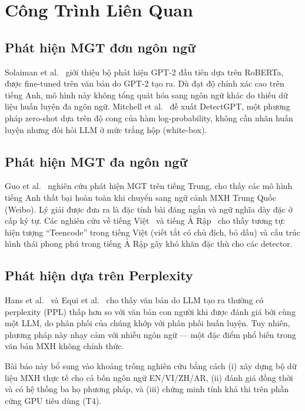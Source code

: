 
\section{Công Trình Liên Quan}
\label{sec:related}

\subsection*{Phát hiện MGT đơn ngôn ngữ}

Solaiman et al.~\cite{solaiman2019gpt2detector} giới thiệu bộ phát hiện
GPT-2 đầu tiên dựa trên RoBERTa, được fine-tuned trên văn bản do GPT-2
tạo ra. Dù đạt độ chính xác cao trên tiếng Anh, mô hình này không tổng
quát hóa sang ngôn ngữ khác do thiếu dữ liệu huấn luyện đa ngôn ngữ.
Mitchell et al.~\cite{mitchell2023detectgpt} đề xuất DetectGPT, một
phương pháp zero-shot dựa trên độ cong của hàm log-probability,
không cần nhãn huấn luyện nhưng đòi hỏi LLM ở mức trắng hộp (white-box).

\subsection*{Phát hiện MGT đa ngôn ngữ}

Guo et al.~\cite{guo2023hcvariant} nghiên cứu phát hiện MGT trên tiếng
Trung, cho thấy các mô hình tiếng Anh thất bại hoàn toàn khi chuyển
sang ngữ cảnh MXH Trung Quốc (Weibo). Lý giải được đưa ra là đặc tính
bài đăng ngắn và ngữ nghĩa dày đặc ở cấp ký tự. Các nghiên cứu về
tiếng Việt~\cite{nguyen2023vsmec} và tiếng Ả Rập~\cite{alomari2022arabic}
cho thấy tương tự: hiện tượng ``Teencode'' trong tiếng Việt (viết tắt
có chủ đích, bỏ dấu) và cấu trúc hình thái phong phú trong tiếng Ả Rập
gây khó khăn đặc thù cho các detector.

\subsection*{Phát hiện dựa trên Perplexity}

Hans et al.~\cite{hans2024binoculars} và Equi et al.~\cite{equi2024ppl}
cho thấy văn bản do LLM tạo ra thường có perplexity (PPL) thấp hơn so
với văn bản con người khi được đánh giá bởi cùng một LLM, do phân phối
của chúng khớp với phân phối huấn luyện. Tuy nhiên, phương pháp này
nhạy cảm với nhiễu ngôn ngữ --- một đặc điểm phổ biến trong văn bản
MXH không chính thức.

Bài báo này bổ sung vào khoảng trống nghiên cứu bằng cách (i) xây dựng
bộ dữ liệu MXH thực tế cho cả bốn ngôn ngữ EN/VI/ZH/AR, (ii) đánh giá
đồng thời và có hệ thống ba họ phương pháp, và (iii) chứng minh tính khả
thi trên phần cứng GPU tiêu dùng (T4).
